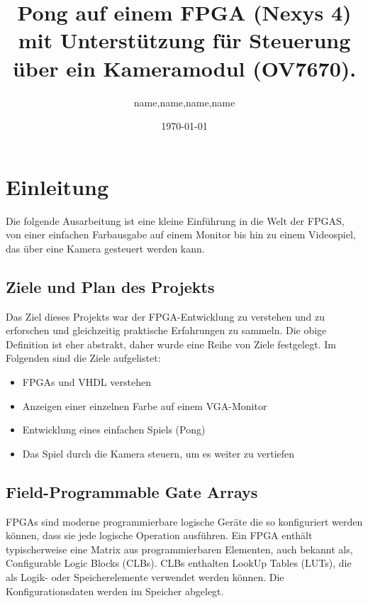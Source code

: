 \documentclass[a4paper, 11pt]{article}
\begin{document}
\title{Pong auf einem FPGA (Nexys 4) mit Unterstützung für Steuerung über ein Kameramodul (OV7670).}
\author{name,name,name,name}
\date{\today{}}

\maketitle                                      
\tableofcontents

\section{Einleitung} Die folgende Ausarbeitung ist eine kleine Einführung in die Welt der FPGAS, von einer einfachen Farbausgabe auf einem Monitor bis hin zu einem Videospiel, das über eine Kamera gesteuert werden kann.   
    

\subsection{Ziele und Plan des Projekts}                             

    Das Ziel dieses Projekts war der FPGA-Entwicklung zu verstehen und zu erforschen und gleichzeitig praktische Erfahrungen zu sammeln. Die obige Definition ist eher abstrakt, daher wurde eine Reihe von Ziele festgelegt. Im Folgenden sind die Ziele aufgelistet:
    \begin{itemize}
        \item FPGAs und VHDL verstehen
        \item Anzeigen einer einzelnen Farbe auf einem VGA-Monitor
        \item Entwicklung eines einfachen Spiels (Pong)
        \item Das Spiel durch die Kamera steuern, um es weiter zu vertiefen
    \end{itemize}

\subsection{Field-Programmable Gate Arrays}

    FPGAs sind moderne programmierbare logische Geräte die so konfiguriert werden können, dass sie jede logische Operation ausführen. Ein FPGA enthält typischerweise eine Matrix aus programmierbaren Elementen, auch bekannt als, Configurable Logic  Blocks (CLBs).  CLBs enthalten LookUp Tables (LUTs), die als Logik- oder Speicherelemente verwendet werden können.   Die Konfigurationsdaten werden im Speicher abgelegt.
    
\end{document}
